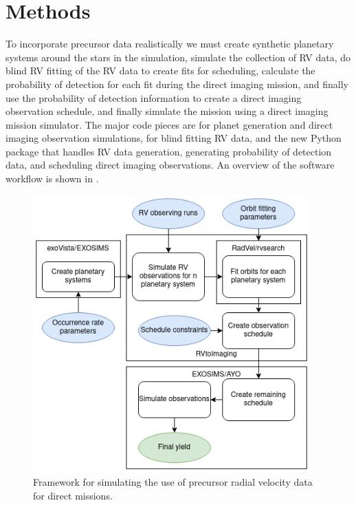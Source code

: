 \section{Methods}
To incorporate precursor data realistically we must create synthetic planetary
systems around the stars in the simulation, simulate the collection of RV data,
do blind RV fitting of the RV data to create fits for scheduling, calculate the
probability of detection for each fit during the direct imaging mission, and
finally use the probability of detection information to create a direct imaging
observation schedule, and finally simulate the mission using a direct imaging
mission simulator. The major code pieces are  for planet
generation and direct imaging observation simulations,  for
blind fitting RV data, and the new Python package  that
handles RV data generation, generating probability of detection data, and
scheduling direct imaging observations. An overview of the software workflow is
shown in .

\begin{figure}
  \begin{center}
    \includegraphics[width=0.95\textwidth]{ch4/figures/flowchartwhite.png}
  \end{center}
  \caption{Framework for simulating the use of precursor radial velocity data
  for direct missions.}
  \label{fig:rv2imgflowchart}
\end{figure}

